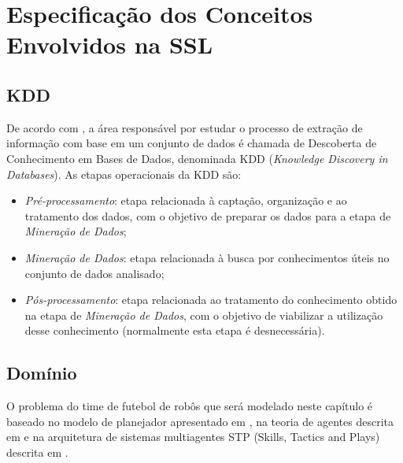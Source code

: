 \chapter{Especificação dos Conceitos Envolvidos na SSL}\label{cap:def_problema}

\section{KDD}

De acordo com \cite{passos2005datamining}, a área responsável por estudar o processo
de extração de informação com base em um conjunto de dados é chamada de Descoberta
de Conhecimento em Bases de Dados, denominada KDD (\textit{Knowledge Discovery in
Databases}). As etapas operacionais da KDD são:

\begin{itemize}
  \item \textit{Pré-processamento}: etapa relacionada à captação,
        organização e ao tratamento dos dados, com o objetivo de
        preparar os dados para a etapa de \textit{Mineração de Dados};
  \item \textit{Mineração de Dados}: etapa relacionada à busca por
        conhecimentos úteis no conjunto de dados analisado;
  \item \textit{Pós-processamento}: etapa relacionada ao tratamento do
        conhecimento obtido na etapa de \textit{Mineração de Dados}, com
        o objetivo de viabilizar a utilização desse conhecimento
        (normalmente esta etapa é desnecessária).
\end{itemize}


\section{Domínio}

O problema do time de futebol de robôs que será modelado neste capítulo é baseado
no modelo de planejador apresentado em \cite{zickler}, na teoria de agentes descrita
em \cite{russellnorvig} e na arquitetura de sistemas multiagentes
STP (Skills, Tactics and Plays) descrita em \cite{bowling2003plays}.




